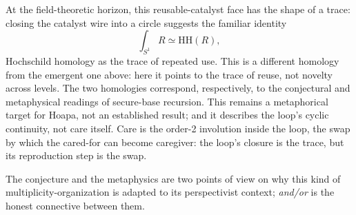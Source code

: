 \documentclass[11pt]{article}
\newcommand{\HH}{\mathrm{HH}}
\begin{document}
At the field-theoretic horizon, this reusable-catalyst face has the shape of a
trace: closing the catalyst wire into a circle suggests the familiar identity
\[
\int_{S^1} R \simeq \HH(R),
\]
Hochschild homology as the trace of repeated use. This is a different homology
from the emergent one above: here it points to the trace of reuse, not novelty
across levels. The two homologies correspond, respectively, to the conjectural
and metaphysical readings of secure-base recursion. This remains a
metaphorical target for Hoapa, not an established result; and it describes the
loop's cyclic continuity, not care itself. Care is the order-2 involution inside
the loop, the swap by which the cared-for can become caregiver: the loop's
closure is the trace, but its reproduction step is the swap.

The conjecture and the metaphysics are two points of view on why this kind of
multiplicity-organization is adapted to its perspectivist context; \emph{and/or}
is the honest connective between them.

\clearpage
\renewcommand{\refname}{Bibliography}
\nocite{*}


\end{document}
